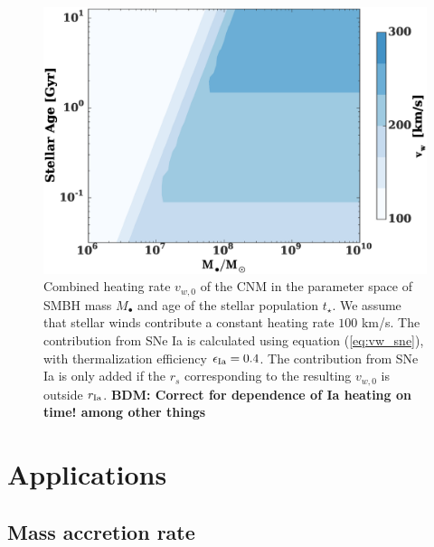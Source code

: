 \documentclass[usenatbib,fleqn]{mn2e}
\newcommand{\Mbh}[1][]{M_{\bullet#1}}
\newcommand{\rIa}{r_{\rm Ia}}
\newcommand{\vwO}{v_{w,0}}
\begin{document}
  \begin{figure}
    \includegraphics[width=\columnwidth]{vw-contour.eps}
    \caption{\label{fig:vweff} Combined heating rate $\vwO$ of the CNM
      in the parameter space of SMBH mass $\Mbh$ and age of the
      stellar population $t_{\star}$.  We assume that stellar winds
      contribute a constant heating rate $100$ km/s. The contribution
      from SNe Ia is calculated using equation (\ref{eq:vw_sne}), with
      thermalization efficiency $\epsilon_{\rm Ia}=0.4$. The
      contribution from SNe Ia is only added if the $r_s$
      corresponding to the resulting $\vwO$ is outside
      $\rIa$.  {\bf BDM: Correct for dependence of Ia heating on time!
      among  other things}}%
  \end{figure}



\section{Applications}
\label{sec:applications}

\subsection{Mass accretion rate}
\label{sec:mdot}
\end{document}

